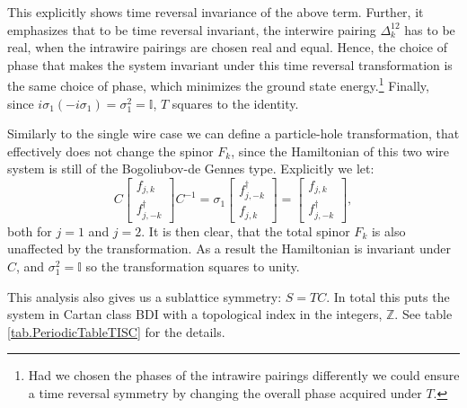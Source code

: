 This explicitly shows time reversal invariance of the above term. Further, it emphasizes that to be time reversal invariant, the interwire pairing $\Delta^{12}_k$ has to be real, when the intrawire pairings are chosen real and equal. Hence, the choice of phase that makes the system invariant under this time reversal transformation is the same choice of phase, which minimizes the ground state energy.\footnote{Had we chosen the phases of the intrawire pairings differently we could ensure a time reversal symmetry by changing the overall phase acquired under $T$.} Finally, since $i\sigma_1(-i\sigma_1) = \sigma_1^2 = \mathbb{I}$, $T$ squares to the identity.  

Similarly to the single wire case we can define a particle-hole transformation, that effectively does not change the spinor $F_k$, since the Hamiltonian of this two wire system is still of the Bogoliubov-de Gennes type. Explicitly we let:
\begin{equation}
C\begin{bmatrix} f_{j,k} \\ f^\dagger_{j,-k} \end{bmatrix}C^{-1} = \sigma_1 \begin{bmatrix} f^\dagger_{j,-k} \\ f_{j,k} \end{bmatrix} = \begin{bmatrix} f_{j,k} \\ f^\dagger_{j,-k} \end{bmatrix}, 
\end{equation} 
both for $j=1$ and $j=2$. It is then clear, that the total spinor $F_k$ is also unaffected by the transformation. As a result the Hamiltonian is invariant under $C$, and $\sigma_1^2 = \mathbb{I}$ so the transformation squares to unity. 

This analysis also gives us a sublattice symmetry: $S = TC$. In total this puts the system in Cartan class BDI with a topological index in the integers, $\mathbb{Z}$. See table \ref{tab.PeriodicTableTISC} for the details. 




